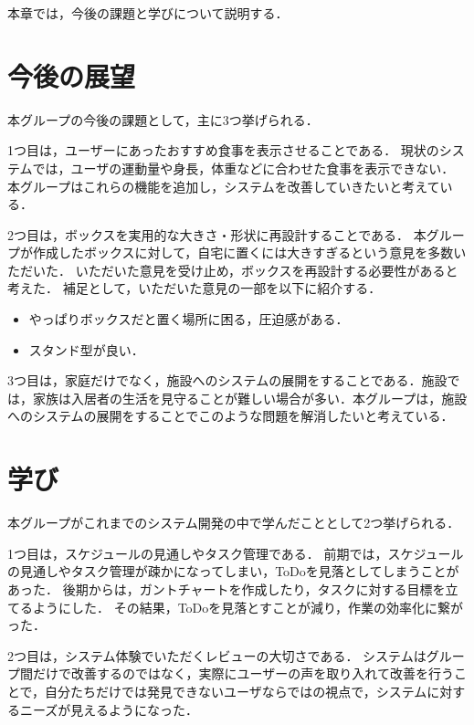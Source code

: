 \documentclass[../report]{subfiles}
\begin{document}
本章では，今後の課題と学びについて説明する．

\section{今後の展望}
本グループの今後の課題として，主に3つ挙げられる．

1つ目は，ユーザーにあったおすすめ食事を表示させることである．
現状のシステムでは，ユーザの運動量や身長，体重などに合わせた食事を表示できない．
本グループはこれらの機能を追加し，システムを改善していきたいと考えている．

2つ目は，ボックスを実用的な大きさ・形状に再設計することである．
本グループが作成したボックスに対して，自宅に置くには大きすぎるという意見を多数いただいた．
いただいた意見を受け止め，ボックスを再設計する必要性があると考えた．
補足として，いただいた意見の一部を以下に紹介する．

\begin{itemize}
    \item やっぱりボックスだと置く場所に困る，圧迫感がある．
    \item スタンド型が良い．
\end{itemize}

3つ目は，家庭だけでなく，施設へのシステムの展開をすることである．施設では，家族は入居者の生活を見守ることが難しい場合が多い．本グループは，施設へのシステムの展開をすることでこのような問題を解消したいと考えている．

\section{学び}
本グループがこれまでのシステム開発の中で学んだこととして2つ挙げられる．

1つ目は，スケジュールの見通しやタスク管理である．
前期では，スケジュールの見通しやタスク管理が疎かになってしまい，ToDoを見落としてしまうことがあった．
後期からは，ガントチャートを作成したり，タスクに対する目標を立てるようにした．
その結果，ToDoを見落とすことが減り，作業の効率化に繋がった．

2つ目は，システム体験でいただくレビューの大切さである．
システムはグループ間だけで改善するのではなく，実際にユーザーの声を取り入れて改善を行うことで，自分たちだけでは発見できないユーザならではの視点で，システムに対するニーズが見えるようになった．
\end{document}
